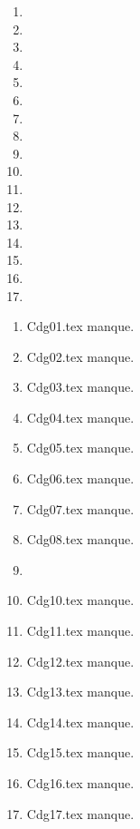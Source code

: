  
 
\begin{enumerate}
  \item  
  \item  
  \item  
  \item  
  \item  
  \item  
  \item  
  \item  
  \item  
  \item  
  \item  
  \item  
  \item  
  \item  
  \item  
  \item  
  \item  
\end{enumerate} 
\clearpage 
{}
\begin{enumerate}
  \item Cdg01.tex manque. 
  \item Cdg02.tex manque. 
  \item Cdg03.tex manque. 
  \item Cdg04.tex manque. 
  \item Cdg05.tex manque. 
  \item Cdg06.tex manque. 
  \item Cdg07.tex manque. 
  \item Cdg08.tex manque. 
  \item  
  \item Cdg10.tex manque. 
  \item Cdg11.tex manque. 
  \item Cdg12.tex manque. 
  \item Cdg13.tex manque. 
  \item Cdg14.tex manque. 
  \item Cdg15.tex manque. 
  \item Cdg16.tex manque. 
  \item Cdg17.tex manque. 
\end{enumerate} 
